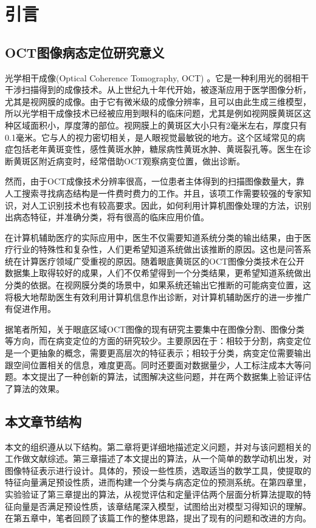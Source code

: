 \chapter{引言}
 
\section{OCT图像病态定位研究意义} %
    光学相干成像(Optical Coherence Tomography, OCT) 。它是一种利用光的弱相干干涉扫描得到的成像技术。从上世纪九十年代开始，被逐渐应用于医学图像分析，尤其是视网膜的成像。由于它有微米级的成像分辨率，且可以由此生成三维模型，所以光学相干成像技术已经被应用到眼科的临床问题，尤其是例如视网膜黄斑区这种区域面积小，厚度薄的部位。视网膜上的黄斑区大小只有2毫米左右，厚度只有0.1毫米。它与人的视力密切相关，是人眼视觉最敏锐的地方。这个区域常见的病症包括老年黄斑变性，感性黄斑水肿，糖尿病性黄斑水肿、黄斑裂孔等。医生在诊断黄斑区附近病变时，经常借助OCT观察病变位置，做出诊断。

    然而，由于OCT成像技术分辨率很高，一位患者主体得到的扫描图像数量大，靠人工搜索寻找病态结构是一件费时费力的工作。并且，该项工作需要较强的专家知识，对人工识别技术也有较高要求。因此，如何利用计算机图像处理的方法，识别出病态特征，并准确分类，将有很高的临床应用价值。
    
    在计算机辅助医疗的实际应用中，医生不仅需要知道系统分类的输出结果，由于医疗行业的特殊性和复杂性，人们更希望知道系统做出该推断的原因。这也是问答系统在计算医疗领域广受重视的原因。随着眼底黄斑区的OCT图像分类技术在公开数据集上取得较好的成果，人们不仅希望得到一个分类结果，更希望知道系统做出分类的依据。在视网膜分类的场景中，如果系统还输出它推断的可能病变位置，这将极大地帮助医生有效利用计算机信息作出诊断，对计算机辅助医疗的进一步推广有促进作用。

    据笔者所知，关于眼底区域OCT图像的现有研究主要集中在图像分割、图像分类等方向，而在病变定位的方面的研究较少。主要原因在于：相较于分割，病变定位是一个更抽象的概念，需要更高层次的特征表示；相较于分类，病变定位需要输出跟空间位置相关的信息，难度更高。同时还要面对数据量少，人工标注成本大等问题。本文提出了一种创新的算法，试图解决这些问题，并在两个数据集上验证评估了算法的效果。

\section{本文章节结构} %
    本文的组织遵从以下结构。第二章将更详细地描述定义问题，并对与该问题相关的工作做文献综述。第三章描述了本文提出的算法，从一个简单的数学动机出发，对图像特征表示进行设计。具体的，预设一些性质，选取适当的数学工具，使提取的特征向量满足预设性质，进而构建一个分类与病态定位的预测系统。在第四章里，实验验证了第三章提出的算法，从视觉评估和定量评估两个层面分析算法提取的特征向量是否满足预设性质，该章结尾深入模型，试图给出对模型习得知识的理解。在第五章中，笔者回顾了该篇工作的整体思路，提出了现有的问题和改进的方向。

